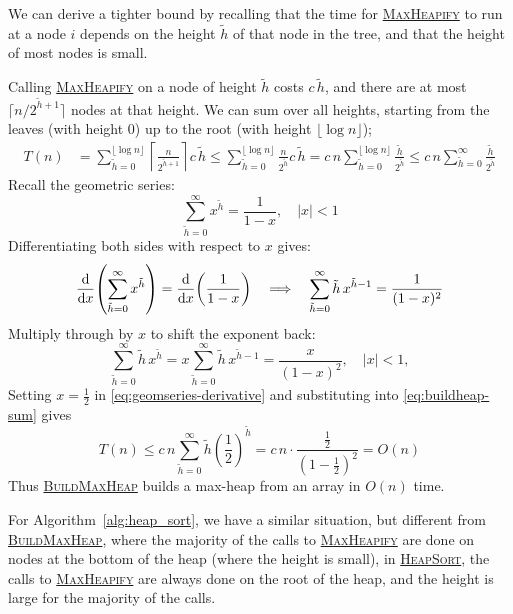 We can derive a tighter bound by recalling that the time for \textsc{\hyperref[alg:heapify]{MaxHeapify}} to run at a node $i$ depends on the height $\tilde h$ of that node in the tree, and that the height of most nodes is small.

Calling \textsc{\hyperref[alg:heapify]{MaxHeapify}} on a node of height $\tilde{h}$ costs $c \, \tilde{h}$, and there are at most $\lceil n/2^{\tilde{h}+1}\rceil$ nodes at that height.  
We can sum over all heights, starting from the leaves (with height $0$) up to the root (with height $\lfloor\log n\rfloor$);
\begin{align}
T(n)
&=   \sum_{\tilde{h}=0}^{\lfloor\log n\rfloor}\left\lceil \frac{n}{2^{\tilde{h}+1}}\right\rceil c \, \tilde{h}
\leq \sum_{\tilde{h}=0}^{\lfloor\log n\rfloor} \frac{n}{2^{\tilde{h}}} c \, \tilde{h}
=    c \, n \sum_{\tilde{h}=0}^{\lfloor\log n\rfloor}\frac{\tilde{h}}{2^{\tilde{h}}}
\leq c \, n \sum_{\tilde{h}=0}^{\infty}\frac{\tilde{h}}{2^{\tilde{h}}}
\label{eq:buildheap-sum}
\end{align}
Recall the geometric series:
\[
  \sum_{\tilde{h}=0}^\infty x^{\tilde{h}} = \frac1{1-x}, \quad |x|<1
\]
Differentiating both sides with respect to \(x\) gives:
\[
  \frac{\mathrm{d}}{\mathrm{d} x}\!\left(\sum_{\tilde{h}=0}^\infty x^{\tilde{h}}\right)
  = \frac{\mathrm{d}}{\mathrm{d} x}\!\left(\frac1{1-x}\right)
  \quad\Longrightarrow\quad
  \sum_{\tilde{h}=0}^\infty \tilde{h}\,x^{\tilde{h}-1} = \frac1{(1-x)^2}
\]
Multiply through by \(x\) to shift the exponent back:
\begin{equation}
\label{eq:geomseries-derivative}
\sum_{\tilde{h}=0}^\infty \tilde{h}\,x^{\tilde{h}}
= x \sum_{\tilde{h}=0}^\infty \tilde{h}\,x^{\tilde{h}-1}
= \frac{x}{(1-x)^2},\quad |x|<1,
\end{equation}
Setting $x=\tfrac12$ in \eqref{eq:geomseries-derivative} and substituting into \eqref{eq:buildheap-sum} gives
\begin{equation}
T(n) \leq c \, n \sum_{\tilde{h}=0}^{\infty}\tilde{h}\left(\frac{1}{2}\right)^{\tilde{h}} = c \, n \cdot \frac{\frac{1}{2}}{\left(1-\frac{1}{2}\right)^2} = O(n)
\end{equation}
Thus \textsc{\hyperref[alg:build_heap]{BuildMaxHeap}} builds a max-heap from an array in $O(n)$ time.


For Algorithm~\ref{alg:heap_sort}, we have a similar situation, but different from \textsc{\hyperref[alg:build_heap]{BuildMaxHeap}}, where the majority of the calls to \textsc{\hyperref[alg:heapify]{MaxHeapify}} are done on nodes at the bottom of the heap (where the height is small), in \textsc{\hyperref[alg:heap_sort]{HeapSort}}, the calls to \textsc{\hyperref[alg:heapify]{MaxHeapify}} are always done on the root of the heap, and the height is large for the majority of the calls.

